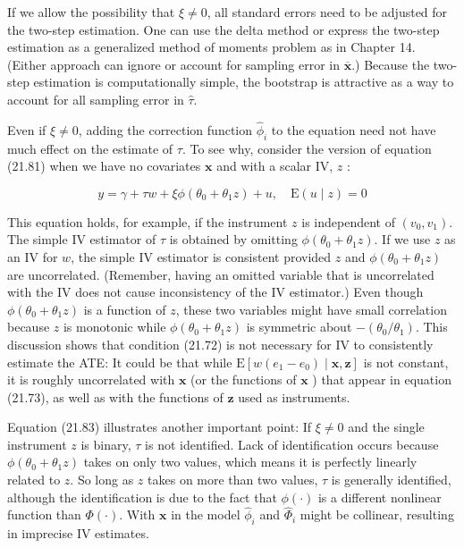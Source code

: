 \documentclass[10pt]{article}
\begin{document}
If we allow the possibility that $\xi \neq 0$, all standard errors need to be adjusted for the two-step estimation. One can use the delta method or express the two-step estimation as a generalized method of moments problem as in Chapter 14. (Either approach can ignore or account for sampling error in $\overline{\mathbf{x}}$.) Because the two-step estimation is computationally simple, the bootstrap is attractive as a way to account for all sampling error in $\hat{\tau}$.

Even if $\xi \neq 0$, adding the correction function $\hat{\phi}_{i}$ to the equation need not have much effect on the estimate of $\tau$. To see why, consider the version of equation (21.81) when we have no covariates $\mathbf{x}$ and with a scalar IV, $z$ :


\begin{equation*}
y=\gamma+\tau w+\xi \phi\left(\theta_{0}+\theta_{1} z\right)+u, \quad \mathrm{E}(u \mid z)=0 \tag{21.83}
\end{equation*}


This equation holds, for example, if the instrument $z$ is independent of $\left(v_{0}, v_{1}\right)$. The simple IV estimator of $\tau$ is obtained by omitting $\phi\left(\theta_{0}+\theta_{1} z\right)$. If we use $z$ as an IV for $w$, the simple IV estimator is consistent provided $z$ and $\phi\left(\theta_{0}+\theta_{1} z\right)$ are uncorrelated. (Remember, having an omitted variable that is uncorrelated with the IV does not cause inconsistency of the IV estimator.) Even though $\phi\left(\theta_{0}+\theta_{1} z\right)$ is a function of $z$, these two variables might have small correlation because $z$ is monotonic while $\phi\left(\theta_{0}+\theta_{1} z\right)$ is symmetric about $-\left(\theta_{0} / \theta_{1}\right)$. This discussion shows that condition (21.72) is not necessary for IV to consistently estimate the ATE: It could be that while $\mathrm{E}\left[w\left(e_{1}-e_{0}\right) \mid \mathbf{x}, \mathbf{z}\right]$ is not constant, it is roughly uncorrelated with $\mathbf{x}$ (or the functions of $\mathbf{x}$ ) that appear in equation (21.73), as well as with the functions of $\mathbf{z}$ used as instruments.

Equation (21.83) illustrates another important point: If $\xi \neq 0$ and the single instrument $z$ is binary, $\tau$ is not identified. Lack of identification occurs because $\phi\left(\theta_{0}+\theta_{1} z\right)$ takes on only two values, which means it is perfectly linearly related to $z$. So long as $z$ takes on more than two values, $\tau$ is generally identified, although the identification is due to the fact that $\phi(\cdot)$ is a different nonlinear function than $\Phi(\cdot)$. With $\mathbf{x}$ in the model $\hat{\phi}_{i}$ and $\hat{\Phi}_{i}$ might be collinear, resulting in imprecise IV estimates.
\end{document}
